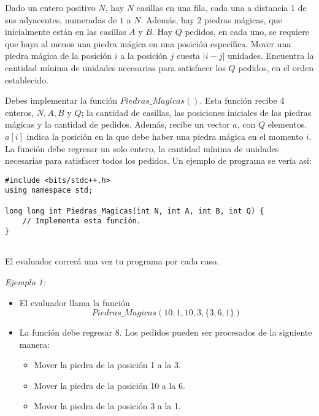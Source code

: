 \documentclass[12pt]{scrartcl}
\begin{document}

    
    \vspace{10pt}

    

        Dado un entero positivo $N$, hay $N$ casillas en una fila, cada una a distancia 1 de sus adyacentes, numeradas de $1$ a $N$. Además, hay 2 piedras mágicas, que inicialmente están en las casillas $A$ y $B$. Hay $Q$ pedidos, en cada uno, se requiere que haya al menos una piedra mágica en una posición específica. Mover una piedra mágica de la posición $i$ a la posición $j$ cuesta $\lvert i - j \lvert$ unidades. Encuentra la cantidad mínima de unidades necesarias para satisfacer los $Q$ pedidos, en el orden establecido. 
        

        Debes implementar la función $Piedras\_Magicas()$. Esta función recibe 4 enteros, $N, A, B$ y $Q$; la cantidad de casillas, las posiciones iniciales de las piedras mágicas y la cantidad de pedidos. Además, recibe un vector $a$, con $Q$ elementos. $a[i]$ indica la posición en la que debe haber una piedra mágica en el momento $i$. La función debe regresar un solo entero, la cantidad mínima de unidades necesarias para satisfacer todos los pedidos. 
        Un ejemplo de programa se vería así:

\begin{verbatim}
#include <bits/stdc++.h>
using namespace std;

long long int Piedras_Magicas(int N, int A, int B, int Q) {
    // Implementa esta función.
}
    
\end{verbatim}

    El evaluador correrá una vez tu programa por cada caso.
    
    
        {\itshape Ejemplo 1: }
        \begin{itemize}
            \item El evaluador llama la función $$Piedras\_Magicas(10, 1, 10, 3, \{3, 6, 1\})$$
            \item La función debe regresar $8$. Los pedidos pueden ser procesados de la siguiente manera:
            \begin{itemize}
                \item Mover la piedra de la posición 1 a la 3.
                \item Mover la piedra de la posición 10 a la 6.
                \item Mover la piedra de la posición 3 a la 1.
            \end{itemize}
        \end{itemize}
\end{document}

